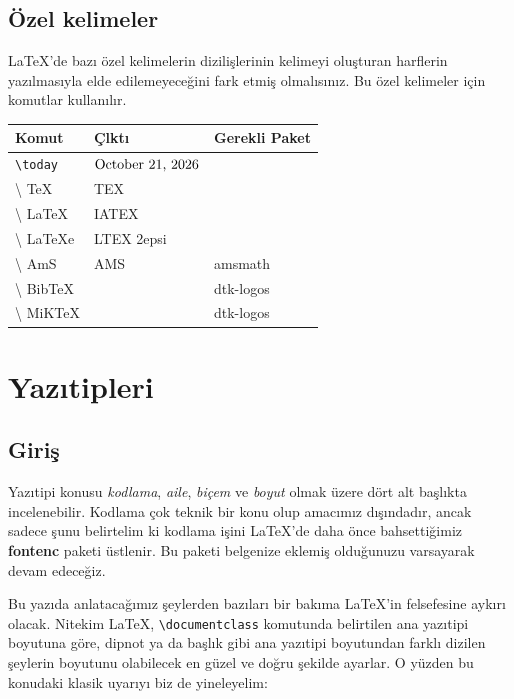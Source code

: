 \documentclass[
  letterpaper,
  DIV=11,
  numbers=noendperiod]{scrreprt}
\begin{document}
\hypertarget{uxf6zel-kelimeler}{%
\subsection{Özel kelimeler}\label{uxf6zel-kelimeler}}

{\LaTeX}'de bazı özel kelimelerin dizilişlerinin kelimeyi oluşturan
harflerin yazılmasıyla elde edilemeyeceğini fark etmiş olmalısınız. Bu
özel kelimeler için komutlar kullanılır.

\begin{longtable}[]{@{}lll@{}}
\toprule()
Komut & Çlktı & Gerekli Paket \\
\midrule()
\endhead
\texttt{\textbackslash{}today} & \(\textrm{\today}\) & \\
\textbackslash{} TeX & TEX & \\
\textbackslash{} LaTeX & IATEX & \\
\textbackslash{} LaTeXe & LTEX 2epsi & \\
\textbackslash{} AmS & AMS & amsmath \\
\textbackslash{} BibTeX & & dtk-logos \\
\textbackslash{} MiKTeX & & dtk-logos \\
\bottomrule()
\end{longtable}

\hypertarget{yazux131tipleri}{%
\section{Yazıtipleri}\label{yazux131tipleri}}

\hypertarget{giriux15f}{%
\subsection{Giriş}\label{giriux15f}}

Yazıtipi konusu \emph{kodlama}, \emph{aile}, \emph{biçem} ve
\emph{boyut} olmak üzere dört alt başlıkta incelenebilir. Kodlama çok
teknik bir konu olup amacımız dışındadır, ancak sadece şunu belirtelim
ki kodlama işini {\LaTeX}'de daha önce bahsettiğimiz \textbf{fontenc}
paketi üstlenir. Bu paketi belgenize eklemiş olduğunuzu varsayarak devam
edeceğiz.

Bu yazıda anlatacağımız şeylerden bazıları bir bakıma {\LaTeX}'in
felsefesine aykırı olacak. Nitekim {\LaTeX},
\texttt{\textbackslash{}documentclass} komutunda belirtilen ana yazıtipi
boyutuna göre, dipnot ya da başlık gibi ana yazıtipi boyutundan farklı
dizilen şeylerin boyutunu olabilecek en güzel ve doğru şekilde ayarlar.
O yüzden bu konudaki klasik uyarıyı biz de yineleyelim:
\end{document}
